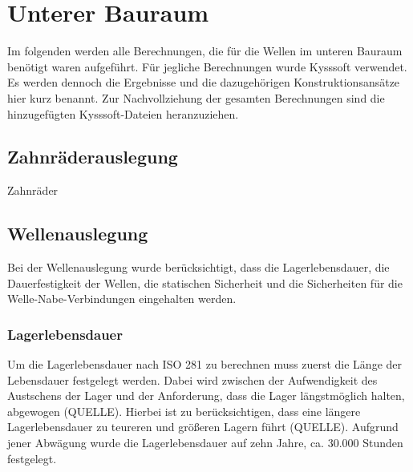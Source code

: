 \section{Unterer Bauraum}

Im folgenden werden alle Berechnungen, die für die Wellen im unteren Bauraum benötigt waren aufgeführt. Für jegliche Berechnungen wurde Kysssoft verwendet. Es werden dennoch die Ergebnisse und die dazugehörigen Konstruktionsansätze hier kurz benannt. Zur Nachvollziehung der gesamten Berechnungen sind die hinzugefügten  Kysssoft-Dateien heranzuziehen. 
\\
\subsection{Zahnräderauslegung}
Zahnräder 


\subsection{Wellenauslegung}
Bei der Wellenauslegung wurde berücksichtigt, dass die Lagerlebensdauer, die Dauerfestigkeit der Wellen, die statischen Sicherheit und die Sicherheiten für die Welle-Nabe-Verbindungen eingehalten werden. 

\subsubsection{Lagerlebensdauer}
Um die Lagerlebensdauer nach ISO 281 zu berechnen muss zuerst die Länge der Lebensdauer festgelegt werden. Dabei wird zwischen der Aufwendigkeit des Austschens der Lager und der Anforderung, dass die Lager längstmöglich halten, abgewogen (QUELLE). Hierbei ist zu berücksichtigen, dass eine längere Lagerlebensdauer zu teureren und größeren Lagern führt (QUELLE). Aufgrund jener Abwägung wurde die Lagerlebensdauer auf zehn Jahre, ca. 30.000 Stunden festgelegt. 




